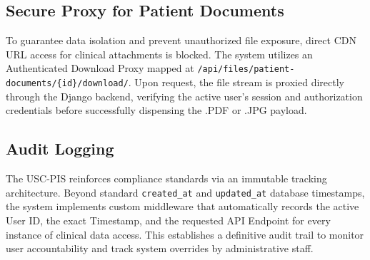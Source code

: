 \subsection{Secure Proxy for Patient Documents}
To guarantee data isolation and prevent unauthorized file exposure, direct CDN URL access for clinical attachments is blocked. The system utilizes an Authenticated Download Proxy mapped at \texttt{/api/files/patient-documents/\{id\}/download/}. Upon request, the file stream is proxied directly through the Django backend, verifying the active user's session and authorization credentials before successfully dispensing the .PDF or .JPG payload.

\subsection{Audit Logging}
The USC-PIS reinforces compliance standards via an immutable tracking architecture. Beyond standard \texttt{created\_at} and \texttt{updated\_at} database timestamps, the system implements custom middleware that automatically records the active User ID, the exact Timestamp, and the requested API Endpoint for every instance of clinical data access. This establishes a definitive audit trail to monitor user accountability and track system overrides by administrative staff.
